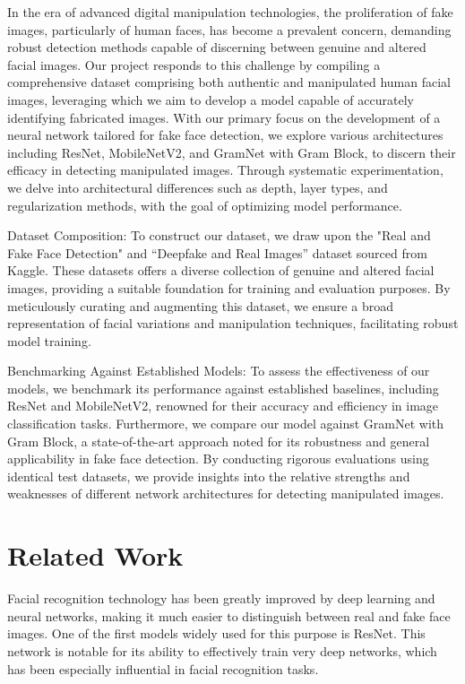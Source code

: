 \documentclass[final]{cvpr}
\begin{document}
In the era of advanced digital manipulation technologies, the proliferation of fake images, particularly of human faces, has become a prevalent concern, demanding robust detection methods capable of discerning between genuine and altered facial images. Our project responds to this challenge by compiling a comprehensive dataset comprising both authentic and manipulated human facial images, leveraging which we aim to develop a model capable of accurately identifying fabricated images. With our primary focus on the development of a neural network tailored for fake face detection, we explore various architectures including ResNet, MobileNetV2, and GramNet with Gram Block, to discern their efficacy in detecting manipulated images. Through systematic experimentation, we delve into architectural differences such as depth, layer types, and regularization methods, with the goal of optimizing model performance.
 
Dataset Composition:
To construct our dataset, we draw upon the "Real and Fake Face Detection" and “Deepfake and Real Images” dataset sourced from Kaggle\cite{kaggledatadeepfakeandrealimages,kaggledatasetRealAndFakeFaceDetection}. These datasets offers a diverse collection of genuine and altered facial images, providing a suitable foundation for training and evaluation purposes. By meticulously curating and augmenting this dataset, we ensure a broad representation of facial variations and manipulation techniques, facilitating robust model training.
 
Benchmarking Against Established Models:
To assess the effectiveness of our models, we benchmark its performance against established baselines, including ResNet and MobileNetV2, renowned for their accuracy and efficiency in image classification tasks. Furthermore, we compare our model against GramNet with Gram Block, a state-of-the-art approach noted for its robustness and general applicability in fake face detection. By conducting rigorous evaluations using identical test datasets, we provide insights into the relative strengths and weaknesses of different network architectures for detecting manipulated images.

\section{Related Work}
Facial recognition technology has been greatly improved by deep learning and neural networks, making it much easier to distinguish between real and fake face images. One of the first models widely used for this purpose is ResNet. This network is notable for its ability to effectively train very deep networks, which has been especially influential in facial recognition tasks\cite{he2015deep}.
\end{document}

